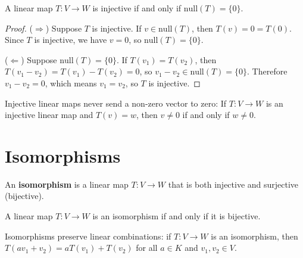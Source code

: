 \begin{theorem}
\label{injective-characterization}
A linear map $T : V \to W$ is injective if and only if $\text{null}(T) = \{0\}$.
\end{theorem}

\begin{proof}
($\Rightarrow$) Suppose $T$ is injective. If $v \in \text{null}(T)$, then $T(v) = 0 = T(0)$. Since $T$ is injective, we have $v = 0$, so $\text{null}(T) = \{0\}$.

($\Leftarrow$) Suppose $\text{null}(T) = \{0\}$. If $T(v_1) = T(v_2)$, then $T(v_1 - v_2) = T(v_1) - T(v_2) = 0$, so $v_1 - v_2 \in \text{null}(T) = \{0\}$. Therefore $v_1 - v_2 = 0$, which means $v_1 = v_2$, so $T$ is injective.
\end{proof}

\begin{theorem}
\label{injective-independence}
Injective linear maps never send a non-zero vector to zero: If $T : V \to W$ is an injective linear map and $T(v) = w$, then $v \neq 0$ if and only if $w \neq 0$.
\end{theorem}

\section{Isomorphisms}

\begin{definition}
\label{isomorphism-def}
An \textbf{isomorphism} is a linear map $T : V \to W$ that is both injective and surjective (bijective).
\end{definition}

\begin{theorem}
\label{isomorphism-characterization}
A linear map $T : V \to W$ is an isomorphism if and only if it is bijective.
\end{theorem}

\begin{theorem}
\label{isomorphism-preserves}
Isomorphisms preserve linear combinations: if $T : V \to W$ is an isomorphism, then $T(a v_1 + v_2) = a T(v_1) + T(v_2)$ for all $a \in K$ and $v_1, v_2 \in V$.
\end{theorem}

